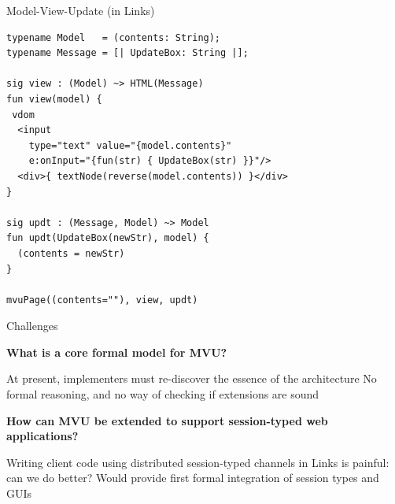 \documentclass[11.5pt, aspectratio=169]{beamer}
\begin{document}
\begin{frame}[fragile]{Model-View-Update (in Links)}

\begin{lstlisting}[language=Links]
typename Model   = (contents: String);
typename Message = [| UpdateBox: String |];

sig view : (Model) ~> HTML(Message)
fun view(model) {
 vdom
  <input
    type="text" value="{model.contents}"
    e:onInput="{fun(str) { UpdateBox(str) }}"/>
  <div>{ textNode(reverse(model.contents)) }</div>
}

sig updt : (Message, Model) ~> Model
fun updt(UpdateBox(newStr), model) {
  (contents = newStr)
}

mvuPage((contents=""), view, updt)
\end{lstlisting}
\end{frame}

\begin{frame}{Challenges}

    \begin{fullpageitemize}
  \item {\Large \textbf{What is a core formal model for MVU?}}
    \begin{itemize}
      \itemR At present, implementers must re-discover the essence of the architecture
      \itemR No formal reasoning, and no way of checking if extensions are sound
    \end{itemize}
    \vspace{1em}
  \item {\Large \textbf{How can MVU be extended to support session-typed web applications?}}
    \begin{itemize}
      \itemR Writing client code using distributed session-typed channels in Links is painful: can we do better?
      \itemR Would provide first formal integration of session types and GUIs
    \end{itemize}
  \end{fullpageitemize}
\end{frame}

\end{document}
